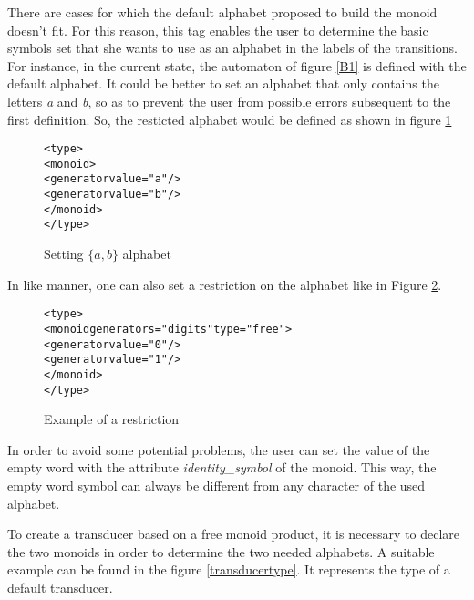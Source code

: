 \documentclass[a4paper]{article}
\begin{document}
There are cases for which the default alphabet proposed to build the
monoid doesn't fit. For this reason, this tag enables the user to
determine the basic symbols set that she wants to use as an alphabet in the
labels of the transitions.\\

For instance, in the current state, the automaton of figure \ref{B1} is
defined with the default alphabet. It could be better to set an alphabet that
only contains the letters \textit{a} and \textit{b}, so as to prevent the user
from possible errors subsequent to the first definition. So, the resticted
alphabet would be defined as shown in figure \ref{alpha1}

{\small

\begin{figure}[h]
  \begin{center}
\begin{alltt}
<type>
  <monoid>
     <generator value="a"/>
     <generator value="b"/>
  </monoid>
</type>
\end{alltt}

\caption{Setting $\{a, b\}$ alphabet}
\label{alpha1}
  \end{center}
\end{figure}
}

In like manner, one can also set a restriction on the alphabet like in Figure \ref{restriction1}.

{\small

\begin{figure}[h]
  \begin{center}
\begin{alltt}
<type>
  <monoid generators="digits" type="free">
    <generator value="0"/>
    <generator value="1"/>
  </monoid>
</type>
\end{alltt}

\caption{Example of a restriction}
\label{restriction1}
  \end{center}
\end{figure}
}

In order to avoid some potential problems, the user can set the value of the
empty word with the attribute \textit{identity\_symbol} of the monoid. This way,
the empty word symbol can always be different from any character of the used
alphabet.

To create a transducer based on a free monoid product, it is necessary to
declare the two monoids in order to determine the two needed alphabets. A
suitable example can be found in the figure \ref{transducertype}. It represents
the type of a default transducer.\\
\end{document}
